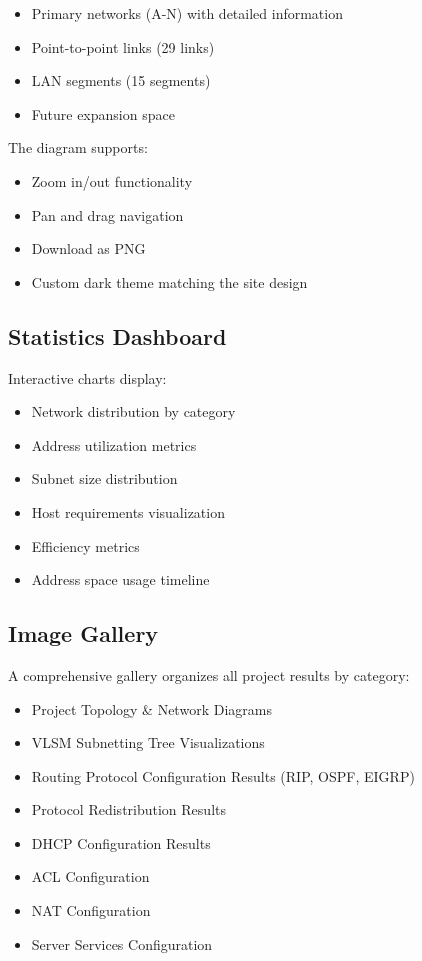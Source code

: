 \documentclass[12pt,a4paper]{report}
\begin{document}
\begin{itemize}
    \item Primary networks (A-N) with detailed information
    \item Point-to-point links (29 links)
    \item LAN segments (15 segments)
    \item Future expansion space
\end{itemize}

The diagram supports:
\begin{itemize}
    \item Zoom in/out functionality
    \item Pan and drag navigation
    \item Download as PNG
    \item Custom dark theme matching the site design
\end{itemize}

\subsection{Statistics Dashboard}

Interactive charts display:
\begin{itemize}
    \item Network distribution by category
    \item Address utilization metrics
    \item Subnet size distribution
    \item Host requirements visualization
    \item Efficiency metrics
    \item Address space usage timeline
\end{itemize}

\subsection{Image Gallery}

A comprehensive gallery organizes all project results by category:

\begin{itemize}
    \item Project Topology \& Network Diagrams
    \item VLSM Subnetting Tree Visualizations
    \item Routing Protocol Configuration Results (RIP, OSPF, EIGRP)
    \item Protocol Redistribution Results
    \item DHCP Configuration Results
    \item ACL Configuration
    \item NAT Configuration
    \item Server Services Configuration
\end{itemize}
\end{document}
